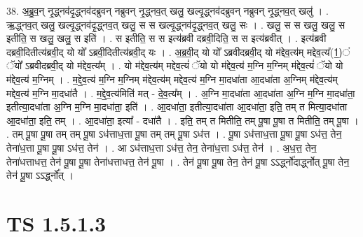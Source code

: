 \documentclass[17pt]{extarticle}
\begin{document}
38. अ॒ब्रु॒व॒न् नृ॒द्ध्नव॑दृ॒द्ध्नव॑दब्रुवन् नब्रुवन् नृ॒द्ध्नव॒त् खलु॒ खल्वृ॒द्ध्नव॑दब्रुवन् नब्रुवन् नृ॒द्ध्नव॒त् खलु॑ । . ऋ॒द्ध्नव॒त् खलु॒ खल्वृ॒द्ध्नव॑दृ॒द्ध्नव॒त् खलु॒ स स खल्वृ॒द्ध्नव॑दृ॒द्ध्नव॒त् खलु॒ सः । . खलु॒ स स खलु॒ खलु॒ स इतीति॒ स खलु॒ खलु॒ स इति॑ । . स इतीति॒ स स इत्य॑ब्रवी दब्रवी॒दिति॒ स स इत्य॑ब्रवीत् । . इत्य॑ब्रवी दब्रवी॒दितीत्य॑ब्रवी॒द् यो यो᳚ ऽब्रवी॒दितीत्य॑ब्रवी॒द् यः । . अ॒ब्र॒वी॒द् यो यो᳚ ऽब्रवीदब्रवी॒द् यो म॑द्देव॒त्य॑म् मद्देव॒त्य᳚(1॒)ं ॅयो᳚ ऽब्रवीदब्रवी॒द् यो म॑द्देव॒त्य᳚म् । . यो म॑द्देव॒त्य॑म् मद्देव॒त्यं॑ ॅयो यो म॑द्देव॒त्य॑ म॒ग्नि म॒ग्निम् म॑द्देव॒त्यं॑ ॅयो यो म॑द्देव॒त्य॑ म॒ग्निम् । . म॒द्दे॒व॒त्य॑ म॒ग्नि म॒ग्निम् म॑द्देव॒त्य॑म् मद्देव॒त्य॑ म॒ग्नि मा॒दधा॑ता आ॒दधा॑ता अ॒ग्निम् म॑द्देव॒त्य॑म् मद्देव॒त्य॑ म॒ग्नि मा॒दधा॑तै । . म॒द्दे॒व॒त्य॑मिति॑ मत् - दे॒व॒त्य᳚म् । . अ॒ग्नि मा॒दधा॑ता आ॒दधा॑ता अ॒ग्नि म॒ग्नि मा॒दधा॑ता॒ इतीत्या॒दधा॑ता अ॒ग्नि म॒ग्नि मा॒दधा॑ता॒ इति॑ । . आ॒दधा॑ता॒ इतीत्या॒दधा॑ता आ॒दधा॑ता॒ इति॒ तम् त मित्या॒दधा॑ता आ॒दधा॑ता॒ इति॒ तम् । . आ॒दधा॑ता॒ इत्या᳚ - दधा॑तै । . इति॒ तम् त मितीति॒ तम् पू॒षा पू॒षा त मितीति॒ तम् पू॒षा । . तम् पू॒षा पू॒षा तम् तम् पू॒षा ऽध॑त्ताध॒त्ता पू॒षा तम् तम् पू॒षा ऽध॑त्त । . पू॒षा ऽध॑त्ताध॒त्ता पू॒षा पू॒षा ऽध॑त्त॒ तेन॒ तेना॑ध॒त्ता पू॒षा पू॒षा ऽध॑त्त॒ तेन॑ । . आ ऽध॑त्ताध॒त्ता ऽध॑त्त॒ तेन॒ तेना॑ध॒त्ता ऽध॑त्त॒ तेन॑ । . अ॒ध॒त्त॒ तेन॒ तेना॑धत्ताधत्त॒ तेन॑ पू॒षा पू॒षा तेना॑धत्ताधत्त॒ तेन॑ पू॒षा । . तेन॑ पू॒षा पू॒षा तेन॒ तेन॑ पू॒षा ऽऽर्द्ध्नो॑दार्द्ध्नोत् पू॒षा तेन॒ तेन॑ पू॒षा ऽऽर्द्ध्नो᳚त् । \newline
\pagebreak
{}
\section*{ TS 1.5.1.3 }
\end{document}
